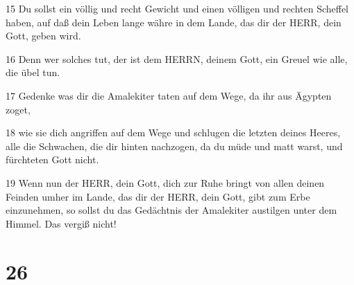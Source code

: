 \par 15 Du sollst ein völlig und recht Gewicht und einen völligen und rechten Scheffel haben, auf daß dein Leben lange währe in dem Lande, das dir der HERR, dein Gott, geben wird.
\par 16 Denn wer solches tut, der ist dem HERRN, deinem Gott, ein Greuel wie alle, die übel tun.
\par 17 Gedenke was dir die Amalekiter taten auf dem Wege, da ihr aus Ägypten zoget,
\par 18 wie sie dich angriffen auf dem Wege und schlugen die letzten deines Heeres, alle die Schwachen, die dir hinten nachzogen, da du müde und matt warst, und fürchteten Gott nicht.
\par 19 Wenn nun der HERR, dein Gott, dich zur Ruhe bringt von allen deinen Feinden umher im Lande, das dir der HERR, dein Gott, gibt zum Erbe einzunehmen, so sollst du das Gedächtnis der Amalekiter austilgen unter dem Himmel. Das vergiß nicht!

\chapter{26}

